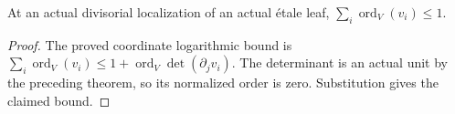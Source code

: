 \begin{corollary}\label{cor:sc0-dvr-etale-leaf-localization-orders}
\leanok
{}
At an actual divisorial localization of an actual \'etale leaf,
$\sum_i\operatorname{ord}_V(v_i)\le1$.
\end{corollary}
\begin{proof}
The proved coordinate logarithmic bound is
$\sum_i\operatorname{ord}_V(v_i)\le1+\operatorname{ord}_V\det(\partial_jv_i)$.
The determinant is an actual unit by the preceding theorem, so its
normalized order is zero. Substitution gives the claimed bound.
\end{proof}
